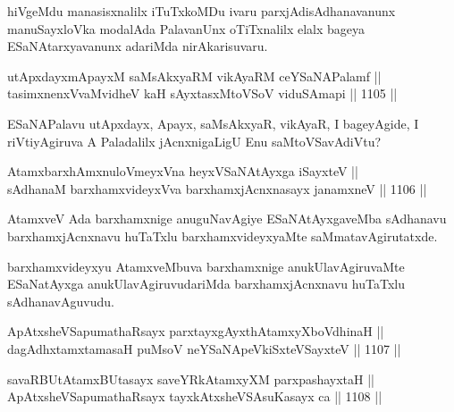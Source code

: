 \begin{artha}
hiVgeMdu manasisxnalilx iTuTxkoMDu ivaru parxjAdisAdhanavanunx manuSayxloVka modalAda PalavanUnx oTiTxnalilx elalx bageya ESaNAtarxyavanunx adariMda nirAkarisuvaru.
\end{artha}


\begin{shl}
utApxdayxmApayxM saMsAkxyaRM vikAyaRM ceYSaNAPalamf || \\
tasimxnenxVvaMvidheV kaH sAyxtasxMtoVSoV viduSAmapi ||  1105 ||  
\end{shl}

\begin{artha}
ESaNAPalavu utApxdayx, Apayx, saMsAkxyaR, vikAyaR, I bageyAgide, I riVtiyAgiruva A Paladalilx jAcnxnigaLigU Enu saMtoVSavAdiVtu?
\end{artha}


\begin{shl}
AtamxbarxhAmxnuloVmeyxVna heyxVSaNAtAyxga iSayxteV || \\
sAdhanaM barxhamxvideyxVva barxhamxjAcnxnasayx janamxneV ||  1106 ||  
\end{shl}

\begin{artha}
AtamxveV Ada barxhamxnige anuguNavAgiye ESaNAtAyxgaveMba sAdhanavu barxhamxjAcnxnavu huTaTxlu barxhamxvideyxyaMte saMmatavAgirutatxde.
\end{artha}


\begin{artha}
barxhamxvideyxyu AtamxveMbuva barxhamxnige anukUlavAgiruvaMte ESaNatAyxga anukUlavAgiruvudariMda barxhamxjAcnxnavu huTaTxlu sAdhanavAguvudu.
\end{artha}

\begin{shl}
ApAtxsheVSapumathaRsayx parxtayxgAyxthAtamxyXboVdhinaH || \\
dagAdhxtamxtamasaH puMsoV neYSaNA\s peVkiSxteVSayxteV ||  1107 ||  
\end{shl}
				
\begin{shl}
savaRBUtAtamxBUtasayx saveYRkAtamxyXM parxpashayxtaH || \\
ApAtxsheVSapumathaRsayx tayxkAtxsheVSAsuKasayx ca ||  1108 ||  
\end{shl}
				
